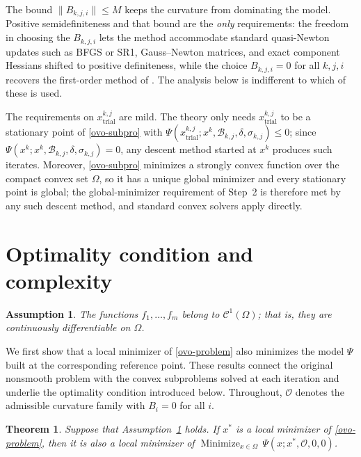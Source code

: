 \documentclass[11pt]{article}
\newcommand{\xkjtrial}{x^{k,j}_{\mathrm{trial}}}
\newcommand{\minimize}{\mathop{\text{Minimize}}}
\newtheorem{theorem}{Theorem}[section]
\newtheorem{assumption}{Assumption}
\begin{document}
The bound $\|B_{k,j,i}\| \leq M$ keeps the curvature from dominating the model.
Positive semidefiniteness and that bound are the \emph{only} requirements: the
freedom in choosing the $B_{k,j,i}$ lets the method accommodate standard
quasi-Newton updates such as BFGS or SR1, Gauss--Newton matrices, and exact
component Hessians shifted to positive definiteness, while the choice
$B_{k,j,i} = 0$ for all $k, j, i$ recovers the first-order method of
\cite{alvarezovo}. The analysis below is indifferent to which of these is used.

The requirements on $\xkjtrial$ are mild. The theory only needs $\xkjtrial$ to
be a stationary point of \eqref{ovo-subpro} with
$\Psi(\xkjtrial; x^k, \mathcal{B}_{k,j}, \delta, \sigma_{k,j}) \leq 0$; since
$\Psi(x^k; x^k, \mathcal{B}_{k,j}, \delta, \sigma_{k,j}) = 0$, any descent method started
at $x^k$ produces such iterates. Moreover, \eqref{ovo-subpro} minimizes a
strongly convex function over the compact convex set $\Omega$, so it has a
unique global minimizer and every stationary point is global; the
global-minimizer requirement of Step~2 is therefore met by any such descent
method, and standard convex solvers apply directly.

\section{Optimality condition and complexity} \label{sec:complexity}

\begin{assumption} \label{a1}
The functions $f_1, \ldots, f_m$ belong to $\mathcal{C}^1(\Omega)$; that is,
they are continuously differentiable on $\Omega$.
\end{assumption}

We first show that a local minimizer of \eqref{ovo-problem} also minimizes the
model $\Psi$ built at the corresponding reference point. These results connect
the original nonsmooth problem with the convex subproblems solved at each
iteration and underlie the optimality condition introduced below. Throughout,
$\mathcal{O}$ denotes the admissible curvature family with $B_i = 0$ for all
$i$.

\begin{theorem} \label{teo:conv1}
Suppose that Assumption~\ref{a1} holds. If $x^*$ is a local minimizer of
\eqref{ovo-problem}, then it is also a local minimizer of
$\minimize_{x \in \Omega}\, \Psi(x; x^*, \mathcal{O}, 0, 0)$.
\end{theorem}
\end{document}
